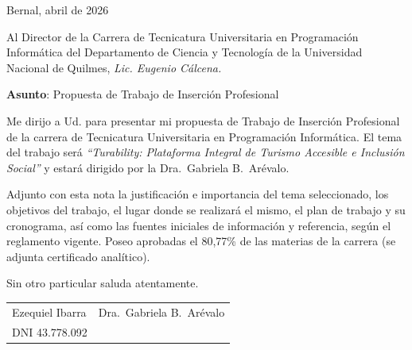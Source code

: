 \documentclass[12pt,a4paper]{article}
\begin{document}
\pagestyle{empty}

\begin{flushright}
Bernal, abril de 2026
\end{flushright}

\vspace{0.5cm}

Al Director de la Carrera de Tecnicatura Universitaria en Programación Informática del
Departamento de Ciencia y Tecnología de la Universidad Nacional de Quilmes,
\textit{Lic. Eugenio Cálcena.}

\vspace{1cm}

\textbf{Asunto}: Propuesta de Trabajo de Inserción Profesional

\vspace{0.5cm}

\hspace{1.5cm} Me dirijo a Ud. para presentar mi propuesta de Trabajo de
Inserción Profesional de la carrera de Tecnicatura Universitaria en Programación
Informática. El tema del trabajo será \textit{``Turability: Plataforma Integral de
Turismo Accesible e Inclusión Social''} y estará dirigido por la Dra.\ Gabriela B.\ Arévalo.

\hspace{1.5cm} Adjunto con esta nota la justificación e importancia del tema
seleccionado, los objetivos del trabajo, el lugar donde se realizará el mismo,
el plan de trabajo y su cronograma, así como las fuentes iniciales de información
y referencia, según el reglamento vigente. Poseo aprobadas el 80{,}77\% de las
materias de la carrera (se adjunta certificado analítico).

\vspace{0.8cm}

\hspace{4cm} Sin otro particular saluda atentamente.

\vspace{2.5cm}

\begin{center}
\begin{tabular}{p{5cm}p{5cm}}
\centering Ezequiel Ibarra   & \centering Dra.\ Gabriela B.\ Arévalo \tabularnewline
\centering DNI 43.778.092    & \tabularnewline
\end{tabular}
\end{center}
\end{document}
